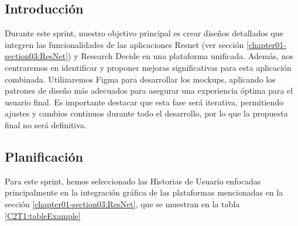 \subsection{Introducción}
Durante este sprint, nuestro objetivo principal es crear diseños detallados que integren las funcionalidades de las aplicaciones Resnet (ver sección \ref{chapter01-section03:ResNet}) y Research Decide en una plataforma unificada. Además, nos centraremos en identificar y proponer mejoras significativas para esta aplicación combinada. Utilizaremos Figma para desarrollar los mockups, aplicando los patrones de diseño más adecuados para asegurar una experiencia óptima para el usuario final. Es importante destacar que esta fase será iterativa, permitiendo ajustes y cambios continuos durante todo el desarrollo, por lo que la propuesta final no será definitiva.

\subsection{Planificación}
Para este sprint, hemos seleccionado las Historias de Usuario enfocadas principalmente en la integración gráfica de las plataformas mencionadas en la sección \ref{chapter01-section03:ResNet}, que se muestran en la tabla \ref{C2T1:tableExample}

